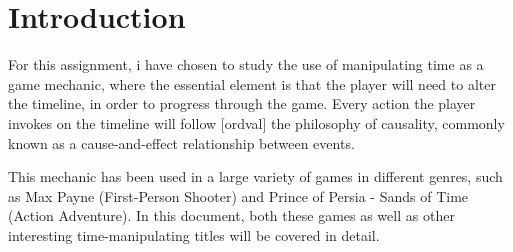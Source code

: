 \chapter{Introduction}
For this assignment, i have chosen to study the use of manipulating time as a game mechanic, where the essential element is that the player will need to alter the timeline, in order to progress through the game. Every action the player invokes on the timeline will follow [ordval] the philosophy of causality, commonly known as a cause-and-effect relationship between events. 

This mechanic has been used in a large variety of games in different genres, such as Max Payne (First-Person Shooter) and Prince of Persia - Sands of Time (Action Adventure). In this document, both these games as well as other interesting time-manipulating titles will be covered in detail. 

